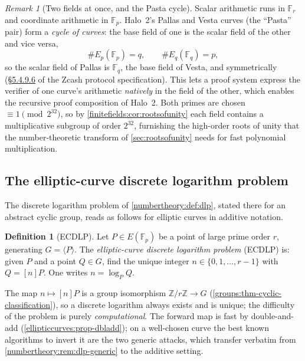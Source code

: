 \documentclass[11pt,a4paper]{article}
\theoremstyle{definition}
\newtheorem{definition}[theorem]{Definition}
\theoremstyle{remark}
\newtheorem{remark}[theorem]{Remark}
\newcommand{\Z}{\ensuremath{\mathbb{Z}}}
\newcommand{\Fp}{\ensuremath{\mathbb{F}_{p}}}
\newcommand{\Fq}{\ensuremath{\mathbb{F}_{q}}}
\newcommand{\Fr}{\ensuremath{\mathbb{F}_{r}}}
\begin{document}
\begin{remark}[Two fields at once, and the Pasta cycle]
\label{ellipticcurves:rem-pasta}
Scalar arithmetic runs in \(\Fr\) and coordinate arithmetic in \(\Fp\).
Halo~2's Pallas and Vesta curves (the ``Pasta'' pair) form a
\emph{cycle of curves}: the base field of one is the scalar field of
the other and vice versa,
\[
  \#E_p(\Fp) = q, \qquad \#E_q(\Fq) = p,
\]
so the scalar field of Pallas is \(\Fq\), the base field of Vesta, and
symmetrically (\href{https://zips.z.cash/protocol/protocol.pdf\#pallasandvesta}{\S5.4.9.6}
of the Zcash protocol
specification). This lets a proof system express the verifier of one
curve's arithmetic \emph{natively} in the field of the other, which
enables the recursive proof composition of Halo~2. Both
primes are chosen \(\equiv 1 \pmod{2^{32}}\), so by
\cref{finitefields:cor:rootsofunity} each field contains a
multiplicative subgroup of order \(2^{32}\), furnishing the high-order
roots of unity that the number-theoretic transform of
\cref{sec:rootsofunity} needs for fast polynomial multiplication.
\end{remark}

\subsection{The elliptic-curve discrete logarithm problem}
\label{ellipticcurves:subsec-ecdlp}

The discrete logarithm problem of \cref{numbertheory:def:dlp}, stated
there for an abstract cyclic group, reads as follows for elliptic curves
in additive notation.

\begin{definition}[ECDLP]\label{ellipticcurves:def-ecdlp}
Let \(P \in E(\Fp)\) be a point of large prime order \(r\), generating
\(G = \langle P \rangle\). The \emph{elliptic-curve discrete logarithm
problem} (ECDLP) is: given \(P\) and a point \(Q \in G\), find the
unique integer \(n \in \{0, 1, \ldots, r - 1\}\) with \(Q = [n]P\). One
writes \(n = \log_P Q\).
\end{definition}

The map \(n \mapsto [n]P\) is a group isomorphism
\(\Z/r\Z \to G\) (\cref{groups:thm-cyclic-classification}), so a
discrete logarithm always exists and is unique; the difficulty of the
problem is purely \emph{computational}. The forward map is fast by
double-and-add (\cref{ellipticcurves:prop-dbladd}); on a well-chosen
curve the best known algorithms to invert it are the two generic attacks,
which transfer verbatim from \cref{numbertheory:rem:dlp-generic} to the
additive setting.
\end{document}
